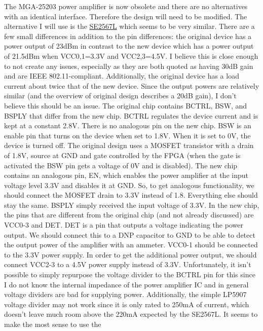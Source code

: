 The MGA-25203 power amplifier is now obsolete and there are no alternatives with an identical
interface. Therefore the design will need to be modified. The alternative I will use is the
\href{http://www.skyworksinc.com/uploads/documents/202425A.pdf}{SE2567L} which seems to be very
similar. There are a few small differences in addition to the pin differences: the original device
has a power output of 23dBm in contrast to the new device which has a power output of 21.5dBm when
VCC0,1=3.3V and VCC2,3=4.5V. I believe this is close enough to not create any issues, especially as
they are both quoted as having 30dB gain and are IEEE 802.11-compliant. Additionally, the original
device has a load current about twice that of the new device. Since the output powers are relatively
similar (and the overview of original design describes a 20dB gain), I don't believe this should be
an issue. The original chip contains BCTRL, BSW, and BSPLY that differ from the new chip. BCTRL
regulates the device current and is kept at a constant 2.8V. There is no analogous pin on the new
chip. BSW is an enable pin that turns on the device when set to 1.8V. When it is set to 0V, the
device is turned off. The original design uses a MOSFET transistor with a drain of 1.8V, source at
GND and gate controlled by the FPGA (when the gate is activated the BSW pin gets a voltage of 0V and
is disabled). The new chip contains an analogous pin, EN, which enables the power amplifier at the
input voltage level 3.3V and disables it at GND. So, to get analogous functionality, we should
connect the MOSFET drain to 3.3V instead of 1.8. Everything else should stay the same. BSPLY simply
received the input voltage of 3.3V. In the new chip, the pins that are different from the original
chip (and not already discussed) are VCC0-3 and DET. DET is a pin that outputs a voltage indicating
the power output. We should connect this to a DNP capacitor to GND to be able to detect the output
power of the amplifier with an ammeter. VCC0-1 should be connected to the 3.3V power supply. In
order to get the additional power output, we should connect VCC2-3 to a 4.5V power supply instead of
3.3V. Unfortunately, it isn't possible to simply repurpose the voltage divider to the BCTRL pin for
this since I do not know the internal impedance of the power amplifier IC and in general voltage
dividers are bad for supplying power. Additionally, the simple LP5907 voltage divider may not work
since it is only rated to 250mA of current, which doesn't leave much room above the 220mA expected
by the SE2567L. It seems to make the most sense to use the
